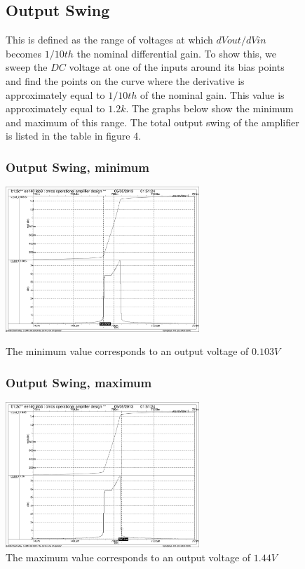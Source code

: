 \documentclass[]{article}
\begin{document}
		\begin{figure}
			\subsection{Output Swing}
			This is defined as the range of voltages at which $dVout/dVin$ becomes $1/10th$ the nominal differential gain. To show this, we sweep the $DC$ voltage at one of the inputs around its bias points and find the points on the curve where the derivative is approximately equal to $1/10th$ of the nominal gain. This value is approximately equal to $1.2k$. The graphs below show the minimum and maximum of this range. The total output swing of the amplifier is listed in the table in figure 4.
				\subsubsection{Output Swing, minimum}
				\includegraphics[width=0.65\textwidth]{OUTPUT_SWING_min_FINAL.pdf}
				\caption{The minimum value corresponds to an output voltage of $0.103V$}
				\subsubsection{Output Swing, maximum}
				\includegraphics[width=0.65\textwidth]{OUTPUT_SWING_max_FINAL.pdf}
				\caption{The maximum value corresponds to an output voltage of $1.44V$}

		\end{figure}
		
\end{document}

